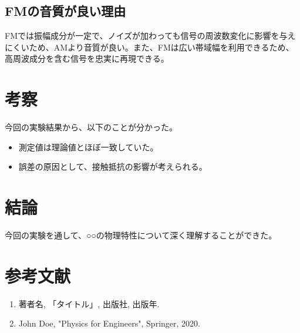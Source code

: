 \documentclass[a4paper, twocolumn]{article} %
\begin{document}
\subsection*{FMの音質が良い理由}
FMでは振幅成分が一定で、ノイズが加わっても信号の周波数変化に影響を与えにくいため、AMより音質が良い。また、FMは広い帯域幅を利用できるため、高周波成分を含む信号を忠実に再現できる。

\section{考察}
今回の実験結果から、以下のことが分かった。
\begin{itemize}
    \item 測定値は理論値とほぼ一致していた。
    \item 誤差の原因として、接触抵抗の影響が考えられる。
\end{itemize}

\section{結論}
今回の実験を通して、○○の物理特性について深く理解することができた。

\section*{参考文献}
\begin{enumerate}
    \item 著者名, 「タイトル」, 出版社, 出版年.
    \item John Doe, "Physics for Engineers", Springer, 2020.
\end{enumerate}
\end{document}
